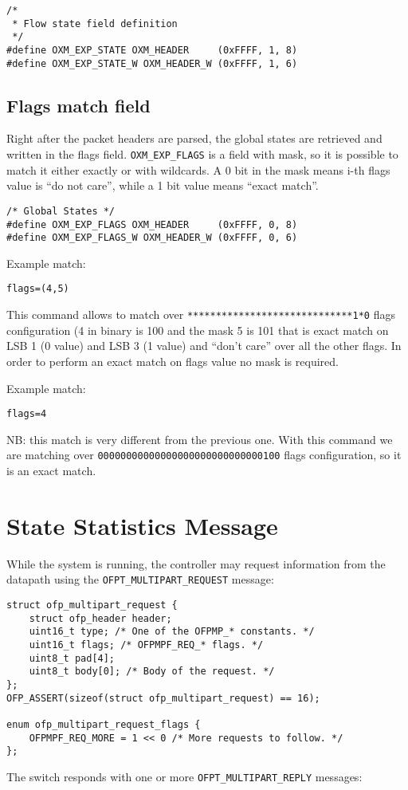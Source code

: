\begin{verbatim}
/*
 * Flow state field definition
 */
#define OXM_EXP_STATE OXM_HEADER     (0xFFFF, 1, 8)
#define OXM_EXP_STATE_W OXM_HEADER_W (0xFFFF, 1, 6)
\end{verbatim}

\subsection{Flags match field}
\label{section:oxm_of_flags}

Right after the packet headers are parsed, the global states are retrieved and written in the flags field. \texttt{OXM\_EXP\_FLAGS} is a field with mask, so it is possible to match it either exactly or with wildcards. A 0 bit in the mask means i-th flags value is ``do not care'', while a 1 bit value means ``exact match''.

\begin{verbatim}
/* Global States */
#define OXM_EXP_FLAGS OXM_HEADER     (0xFFFF, 0, 8)
#define OXM_EXP_FLAGS_W OXM_HEADER_W (0xFFFF, 0, 6) 
\end{verbatim}
Example match:

\begin{verbatim}
flags=(4,5)
\end{verbatim}
This command allows to match over \texttt{*****************************1*0} flags configuration (4 in binary is 100 and the mask 5 is 101 that is exact match on LSB 1 (0 value) and LSB 3 (1 value) and ``don’t care'' over all the other flags. In order to perform an exact match on flags value no mask is required.

Example match:
\begin{verbatim}
flags=4
\end{verbatim}
NB: this match is very different from the previous one. With this command we are matching over \texttt{00000000000000000000000000000100} flags configuration, so it is an exact match.


\section{State Statistics Message}

\label{sec:msg_state_stats_proto}

While the system is running, the controller may request information from the datapath using the \texttt{OFPT\_MULTIPART\_REQUEST} message:

\begin{verbatim}
struct ofp_multipart_request {
    struct ofp_header header;
    uint16_t type; /* One of the OFPMP_* constants. */
    uint16_t flags; /* OFPMPF_REQ_* flags. */
    uint8_t pad[4];
    uint8_t body[0]; /* Body of the request. */
};
OFP_ASSERT(sizeof(struct ofp_multipart_request) == 16);

enum ofp_multipart_request_flags {
    OFPMPF_REQ_MORE = 1 << 0 /* More requests to follow. */
};
\end{verbatim}
The switch responds with one or more \texttt{OFPT\_MULTIPART\_REPLY} messages:

